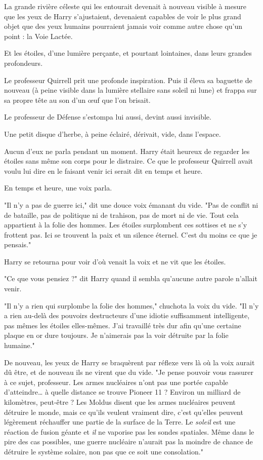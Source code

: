 La grande rivière céleste qui les entourait devenait à nouveau visible à mesure que les yeux de Harry s'ajustaient, devenaient capables de voir le plus grand objet que des yeux humains pourraient jamais voir comme autre chose qu'un point : la Voie Lactée.

Et les étoiles, d'une lumière perçante, et pourtant lointaines, dans leurs grandes profondeurs.

Le professeur Quirrell prit une profonde inspiration. Puis il éleva sa baguette de nouveau (à peine visible dans la lumière stellaire sans soleil ni lune) et frappa sur sa propre tête au son d'un œuf que l'on brisait.

Le professeur de Défense s'estompa lui aussi, devint aussi invisible.

Une petit disque d'herbe, à peine éclairé, dérivait, vide, dans l'espace.

Aucun d'eux ne parla pendant un moment. Harry était heureux de regarder les étoiles sans même son corps pour le distraire. Ce que le professeur Quirrell avait voulu lui dire en le faisant venir ici serait dit en temps et heure.

En temps et heure, une voix parla.

"Il n'y a pas de guerre ici," dit une douce voix émanant du vide. "Pas de conflit ni de bataille, pas de politique ni de trahison, pas de mort ni de vie. Tout cela appartient à la folie des hommes. Les étoiles surplombent ces sottises et ne s'y frottent pas. Ici se trouvent la paix et un silence éternel. C'est du moins ce que je pensais."

Harry se retourna pour voir d'où venait la voix et ne vit que les étoiles.

"Ce que vous pensiez ?" dit Harry quand il sembla qu'aucune autre parole n'allait venir.

"Il n'y a rien qui surplombe la folie des hommes," chuchota la voix du vide. "Il n'y a rien au-delà des pouvoirs destructeurs d'une idiotie suffisamment intelligente, pas mêmes les étoiles elles-mêmes. J'ai travaillé très dur afin qu'une certaine plaque en or dure toujours. Je n'aimerais pas la voir détruite par la folie humaine."

De nouveau, les yeux de Harry se braquèrent par réflexe vers là où la voix aurait dû être, et de nouveau ils ne virent que du vide. "Je pense pouvoir vous rassurer à ce sujet, professeur. Les armes nucléaires n'ont pas une portée capable d'atteindre… à quelle distance se trouve Pioneer 11 ? Environ un milliard de kilomètres, peut-être ? Les Moldus disent que les armes nucléaires peuvent détruire le monde, mais ce qu'ils veulent vraiment dire, c'est qu'elles peuvent légèrement réchauffer une partie de la surface de la Terre. Le \emph{soleil}  est une réaction de fusion géante et \emph{il}  ne vaporise pas les sondes spatiales. Même dans le pire des cas possibles, une guerre nucléaire n'aurait pas la moindre de chance de détruire le système solaire, non pas que ce soit une consolation."

